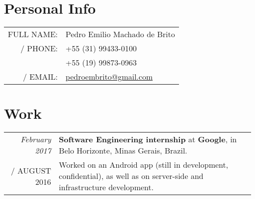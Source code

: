 \documentclass[a4paper,10pt]{article}
\makeatletter
\def\fakesc#1{%
  \begingroup%
  \xdef\fake@name{\csname\curr@fontshape/\f@size\endcsname}%
  \fontsize{\fontdimen8\fake@name}{\baselineskip}\selectfont%
  \uppercase{#1}%
  \endgroup%
}
\renewcommand{\textsc}{\fakesc}
\makeatother
\begin{document}
\pagestyle{empty} %

\par{\bigskip\par}

\section{Personal Info}

\begin{tabularx}{\textwidth}{ rl}
  \textsc{Full name:} & Pedro Emilio Machado de Brito \\
  \textsc{Phone:} & +55 (31) 99433-0100 \\
 & +55 (19) 99873-0963 \\
  \textsc{Email:} & \href{mailto:pedroembrito@gmail.com}{pedroembrito@gmail.com}\\
\end{tabularx}




\section{Work}

\begin{tabularx}{\textwidth}{r|X}	

  \emph{February 2017} & \textbf{Software Engineering internship} at \textbf{Google}, in Belo Horizonte, Minas Gerais, Brazil.\\
  \textsc{August 2016} & \footnotesize{Worked on an Android app (still in development, confidential), as well as on server-side and infrastructure development}.\\

\end{tabularx}
\end{document}
